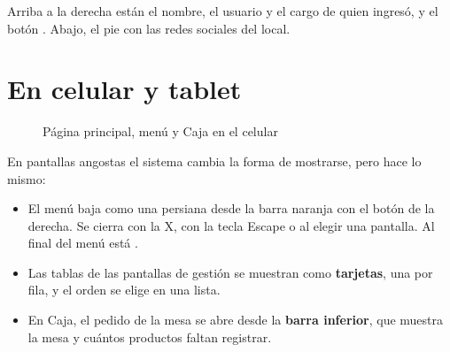 Arriba a la derecha están el nombre, el usuario y el cargo de quien ingresó, y el botón . Abajo, el pie con las redes sociales del local.

\section{En celular y tablet}
\label{sec:celular}

\begin{figure}[!htb]
  \centering
  \hspace{0.04\linewidth}
  \hspace{0.04\linewidth}
  \caption{Página principal, menú y Caja en el celular}
\end{figure}

En pantallas angostas el sistema cambia la forma de mostrarse, pero hace lo mismo:

\begin{itemize}
  \item El menú baja como una persiana desde la barra naranja con el botón de la derecha. Se cierra con la X, con la tecla Escape o al elegir una pantalla. Al final del menú está .
  \item Las tablas de las pantallas de gestión se muestran como \textbf{tarjetas}, una por fila, y el orden se elige en una lista.
  \item En Caja, el pedido de la mesa se abre desde la \textbf{barra inferior}, que muestra la mesa y cuántos productos faltan registrar.
\end{itemize}
